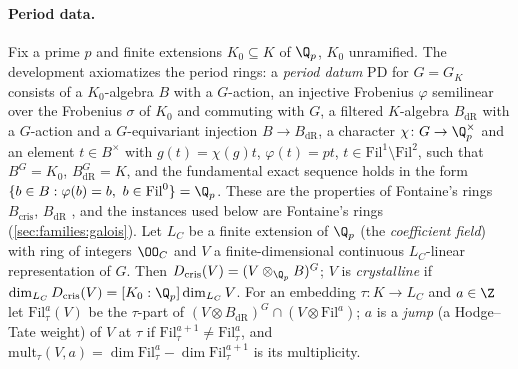 \paragraph{Period data.}
Fix a prime $p$ and finite extensions $K_0\subseteq K$ of $\Q_p$, $K_0$ unramified. The development axiomatizes
the period rings: a \emph{period datum} $\mathrm{PD}$ for $G=G_K$ consists of a $K_0$-algebra $B$ with a
$G$-action, an injective Frobenius $\varphi$ semilinear over the Frobenius $\sigma$ of $K_0$ and commuting with
$G$, a filtered $K$-algebra $B_{\mathrm{dR}}$ with a $G$-action and a $G$-equivariant injection $B\to B_{\mathrm{dR}}$,
a character $\chi\colon G\to\Q_p^\times$ and an element $t\in B^\times$ with $g(t)=\chi(g)t$, $\varphi(t)=pt$,
$t\in\mathrm{Fil}^1\setminus\mathrm{Fil}^2$, such that $B^G=K_0$, $B_{\mathrm{dR}}^G=K$, and the fundamental exact
sequence holds in the form $\{b\in B:\varphi(b)=b,\ b\in\mathrm{Fil}^0\}=\Q_p$. These are the properties of
Fontaine's rings $B_{\mathrm{cris}}$, $B_{\mathrm{dR}}$ \cite{Fontaine1982,Fontaine1994}, and the instances used
below are Fontaine's rings (\cref{sec:families:galois}). Let $L_C$ be a finite extension of $\Q_p$ (the
\emph{coefficient field}) with ring of integers $\OO_C$ and $V$ a finite-dimensional continuous $L_C$-linear
representation of $G$. Then $D_{\mathrm{cris}}(V)=(V\otimes_{\Q_p}B)^G$; $V$ is \emph{crystalline} if
$\dim_{L_C}D_{\mathrm{cris}}(V)=[K_0:\Q_p]\dim_{L_C}V$. For an embedding $\tau\colon K\to L_C$ and $a\in\Z$ let
$\mathrm{Fil}^a_\tau(V)$ be the $\tau$-part of $(V\otimes B_{\mathrm{dR}})^G\cap(V\otimes\mathrm{Fil}^a)$; $a$ is a
\emph{jump} (a Hodge--Tate weight) of $V$ at $\tau$ if $\mathrm{Fil}^{a+1}_\tau\ne\mathrm{Fil}^a_\tau$, and
$\mathrm{mult}_\tau(V,a)=\dim\mathrm{Fil}^a_\tau-\dim\mathrm{Fil}^{a+1}_\tau$ is its multiplicity.

